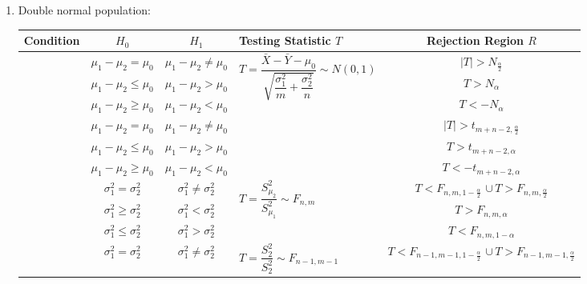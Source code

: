 \begin{enumerate}
    \item Double normal population:
    
    \begin{table}[htbp]
        \centering
        \renewcommand\arraystretch{1.2}
        \begin{tabularx}{\linewidth}{|c|c|c|Y|c|}
            \hline
            Condition&$H_0$&$H_1$&Testing Statistic $T$&Rejection Region $R$\\
            \hline
            &$\mu_1-\mu_2=\mu_0$&$\mu_1-\mu_2\neq\mu_0$&&$|T|>N_\frac{\alpha}{2}$\\
                &$\mu_1-\mu_2\leq\mu_0$&$\mu_1-\mu_2>\mu_0$&&$T>N_\alpha$\\
                &$\mu_1-\mu_2\geq\mu_0$&$\mu_1-\mu_2<\mu_0$&&$T<-N_\alpha$\\
                \hline
                &$\mu_1-\mu_2=\mu_0$&$\mu_1-\mu_2\neq\mu_0$&&$|T|>t_{m+n-2,\frac{\alpha}{2}}$\\
                &$\mu_1-\mu_2\leq\mu_0$&$\mu_1-\mu_2>\mu_0$&&$T>t_{m+n-2,\alpha}$\\
                &$\mu_1-\mu_2\geq\mu_0$&$\mu_1-\mu_2<\mu_0$&&$T<-t_{m+n-2,\alpha}$\\
                \hline
                &$\sigma_1^2=\sigma_2^2$&$\sigma_1^2\neq\sigma_2^2$&&\\
                &$\sigma_1^2\geq\sigma_2^2$&$\sigma_1^2<\sigma_2^2$&&$T>F_{n,m,\alpha}$\\
                &$\sigma_1^2\leq\sigma_2^2$&$\sigma_1^2>\sigma_2^2$&&$T<F_{n,m,1-\alpha}$\\
                \hline
                &$\sigma_1^2=\sigma_2^2$&$\sigma_1^2\neq\sigma_2^2$&&\\

\end{tabularx}
\end{table}
\end{enumerate}
